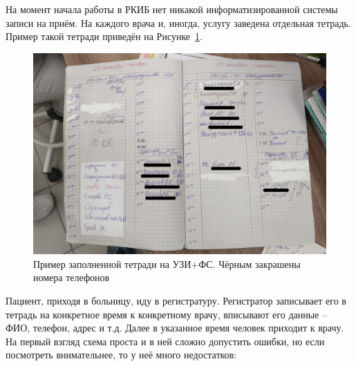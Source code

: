 \documentclass[a4paper,article]{article}
\begin{document}
\begin{sloppypar}
        На момент начала работы в РКИБ нет никакой информатизированной системы записи на приём. На каждого врача и, иногда, услугу заведена отдельная тетрадь. Пример такой тетради приведён на Рисунке~\ref{fig:Тетрадь на УЗИ+ФС}.

        \begin{figure}[h]
            \centering
            \includegraphics[width=0.8\linewidth]{Пример заполненной тетради на УЗИ+ФС. Чёрным закрашены номера телефонов.png}
            \caption{\centering Пример заполненной тетради на УЗИ+ФС. Чёрным закрашены номера телефонов}
            \label{fig:Тетрадь на УЗИ+ФС}
        \end{figure}

        Пациент, приходя в больницу, иду в регистратуру. Регистратор записывает его в тетрадь на конкретное время к конкретному врачу, вписывают его данные  -- ФИО, телефон, адрес и т.д. Далее в указанное время человек приходит к врачу.
        На первый взгляд схема проста и в ней сложно допустить ошибки, но если посмотреть внимательнее, то у неё много недостатков:


\end{sloppypar}
\end{document}

